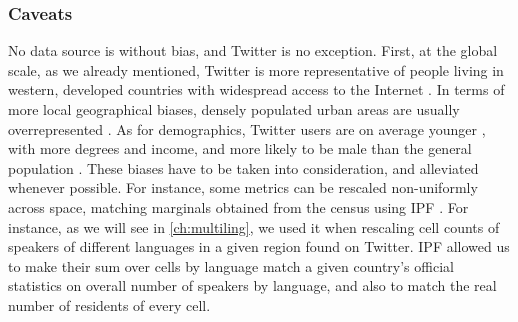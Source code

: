 \documentclass[../thesis.tex]{subfiles}
\begin{document}
\subsubsection{Caveats}
\label{sec:twitter_biases}
No data source is without bias, and Twitter is no exception. First, at the global scale,
as we already mentioned, Twitter is more representative of people living in western,
developed countries with widespread access to the Internet
\cite{HawelkaGeolocatedTwitter2014,MocanuTwitterBabel2013}. In terms of more local
geographical biases, densely populated urban areas are usually overrepresented
\cite{MisloveUnderstandingDemographics2011,JiangUnderstandingDemographic2019,AuxierSocialMedia2021}.
As for demographics, Twitter users are on average younger
\cite{NguyenHowOld2013,AuxierSocialMedia2021,SloanWhoTweets2017}, with more degrees and
income, and more likely to be male
than the general population \cite{MisloveUnderstandingDemographics2011,AuxierSocialMedia2021,SloanWhoTweets2017}. These biases have to be taken into consideration, and
alleviated whenever possible. For instance, some metrics can be rescaled non-uniformly
across space, matching marginals obtained from the census using \ac{IPF}
\cite{DemingLeastSquares1940,FienbergIterativeProcedure1970}. For instance, as we will
see in \cref{ch:multiling}, we used it when rescaling cell counts of speakers of
different languages in a given region found on Twitter. \Ac{IPF} allowed us to make
their sum over cells by language match a given country's official statistics on overall
number of speakers by language, and also to match the real number of residents of every
cell.
\end{document}
